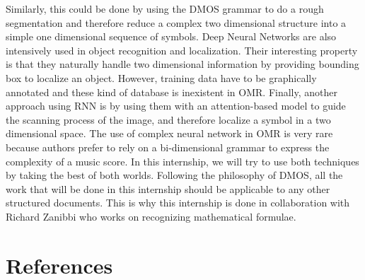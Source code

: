 \documentclass[11pt]{sdm}
\begin{document}
Similarly, this could be done by using the DMOS grammar to do a rough segmentation and therefore reduce a complex two dimensional structure into a simple one dimensional sequence of symbols.
Deep Neural Networks are also intensively used in object recognition and localization.
Their interesting property is that they naturally handle two dimensional information by providing bounding box to localize an object.
However, training data have to be graphically annotated and these kind of database is inexistent in OMR.
Finally, another approach using RNN is by using them with an attention-based model to guide the scanning process of the image, and therefore localize a symbol in a two dimensional space.
The use of complex neural network in OMR is very rare because authors prefer to rely on a bi-dimensional grammar to express the complexity of a music score.
In this internship, we will try to use both techniques by taking the best of both worlds.
Following the philosophy of DMOS, all the work that will be done in this internship should be applicable to any other structured documents.
This is why this internship is done in collaboration with Richard Zanibbi who works on recognizing mathematical formulae.

\section*{References}



\end{document}
